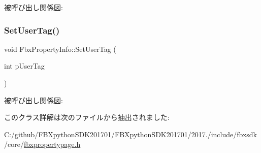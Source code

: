 被呼び出し関係図\+:
\mbox{\label{class_fbx_property_info_af602f7b028dd1d1c43f5181650ddda5e}} 
\subsubsection{\texorpdfstring{Set\+User\+Tag()}{SetUserTag()}}
{\footnotesize\ttfamily void Fbx\+Property\+Info\+::\+Set\+User\+Tag (\begin{DoxyParamCaption}\item[{int}]{p\+User\+Tag }\end{DoxyParamCaption})}

被呼び出し関係図\+:


このクラス詳解は次のファイルから抽出されました\+:\begin{DoxyCompactItemize}
\item 
C\+:/github/\+F\+B\+Xpython\+S\+D\+K201701/\+F\+B\+Xpython\+S\+D\+K201701/2017./include/fbxsdk/core/\hyperlink{fbxpropertypage_8h}{fbxpropertypage.\+h}\end{DoxyCompactItemize}
